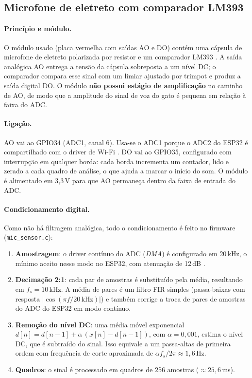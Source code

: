 \subsection{Microfone de eletreto com comparador LM393}
\label{sec:mic}

\paragraph{Princípio e módulo.}
O módulo usado (placa vermelha com saídas AO e DO) contém uma cápsula de microfone de eletreto polarizada por resistor e um comparador LM393 \citep{tilm393}. A saída analógica AO entrega a tensão da cápsula sobreposta a um nível DC; o comparador compara esse sinal com um limiar ajustado por trimpot e produz a saída digital DO. O módulo \textbf{não possui estágio de amplificação} no caminho de AO, de modo que a amplitude do sinal de voz do gato é pequena em relação à faixa do ADC. 

\paragraph{Ligação.}
AO vai ao GPIO34 (ADC1, canal 6). Usa-se o ADC1 porque o ADC2 do ESP32 é compartilhado com o driver de Wi-Fi \citep{espidfadc}. DO vai ao GPIO35, configurado com interrupção em qualquer borda: cada borda incrementa um contador, lido e zerado a cada quadro de análise, o que ajuda a marcar o início do som. O módulo é alimentado em 3,3\,V para que AO permaneça dentro da faixa de entrada do ADC.

\paragraph{Condicionamento digital.}
Como não há filtragem analógica, todo o condicionamento é feito no firmware (\texttt{mic\_sensor.c}):
\begin{enumerate}
  \item \textbf{Amostragem}: o driver contínuo do ADC (\textit{DMA}) é configurado em 20\,kHz, o mínimo aceito nesse modo no ESP32, com atenuação de 12\,dB \citep{espidfadc}.
  \item \textbf{Decimação 2:1}: cada par de amostras é substituído pela média, resultando em $f_s = 10$\,kHz. A média de pares é um filtro FIR simples (passa-baixas com resposta $|\cos(\pi f / 20\,\text{kHz})|$) e também corrige a troca de pares de amostras do ADC do ESP32 em modo contínuo.
  \item \textbf{Remoção do nível DC}: uma média móvel exponencial $d[n] = d[n-1] + \alpha\,(x[n]-d[n-1])$, com $\alpha = 0{,}001$, estima o nível DC, que é subtraído do sinal. Isso equivale a um passa-altas de primeira ordem com frequência de corte aproximada de $\alpha f_s / 2\pi \approx 1{,}6$\,Hz.
  \item \textbf{Quadros}: o sinal é processado em quadros de 256 amostras ($\approx 25{,}6$\,ms).
\end{enumerate}

